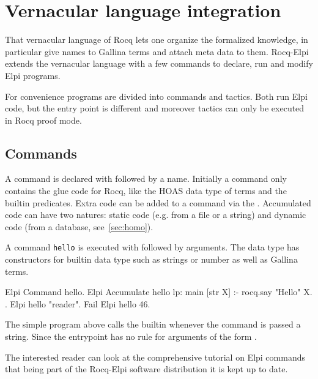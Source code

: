 \documentclass[a4paper, 11pt]{book}
\begin{document}


\section{Vernacular language integration}

That vernacular language of Rocq lets one organize the formalized knowledge,
in particular give names to Gallina terms and attach meta data to them.
Rocq-Elpi extends the vernacular language with a few commands to declare, run
and modify Elpi programs.

For convenience programs are divided into commands and tactics. Both run
Elpi code, but the entry point is different and moreover tactics can only
be executed in Rocq proof mode.

\subsection{Commands}

A command is declared with  followed by a name.
Initially a command only contains the glue code for Rocq, like the
HOAS data type of terms and the builtin predicates. Extra code
can be added to a command via the .
Accumulated code can have two natures: static code (e.g. from a file
or a string) and dynamic code (from a database, see~\ref{sec:homo}).

A command \texttt{hello} is executed with  followed
by arguments. The  data type has constructors
for builtin data type such as strings or number as well as Gallina terms.

\begin{rocqcode}
Elpi Command hello.
Elpi Accumulate hello lp:{{
  main [str X] :- rocq.say "Hello" X.
}}.
Elpi hello "reader".
Fail Elpi hello 46.
\end{rocqcode}

The simple program above calls the  builtin whenever the
command is passed a string. Since the entrypoint  has
no rule for arguments of the form .

The interested reader can look at the comprehensive tutorial on Elpi
commands~\cite{tuto:commands} that being part of the Rocq-Elpi software
distribution it is kept up to date.
\end{document}
